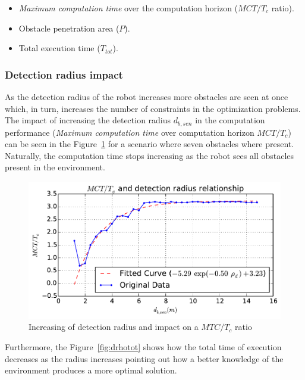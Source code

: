 \documentclass[eprint]{actapoly}
\begin{document}
\begin{itemize}

\item
\textit{Maximum computation time} over the computation horizon ($MCT/T_c$ 
ratio).

\item
Obstacle penetration area ($P$).

\item
Total execution time ($T_{tot}$).

\end{itemize}

\subsubsection{Detection radius impact}

As the detection radius of the robot increases more obstacles are
seen at once which, in turn,
increases the number of constraints in the optimization problems.
The impact of increasing the detection radius $d_{b,sen}$ in the computation
performance (\textit{Maximum computation time} over computation horizon $MCT/T_c$) can
be seen in the Figure~\ref{fig:drhormp} for a scenario where seven obstacles where present.
Naturally, the computation time stops increasing as the robot sees all obstacles present
in the environment.

\begin{figure}[!h]\centering
  \includegraphics[width=\linewidth]{./images/drho/drho-rmp.pdf} %
  \caption{Increasing of detection radius and impact on a $MTC/T_c$ 
ratio\label{fig:drhormp}}
\end{figure}

Furthermore, the Figure~\ref{fig:drhotot} shows how the total time of execution
decreases as the radius increases pointing out how a better knowledge of the
environment produces a more optimal solution.
\end{document}
